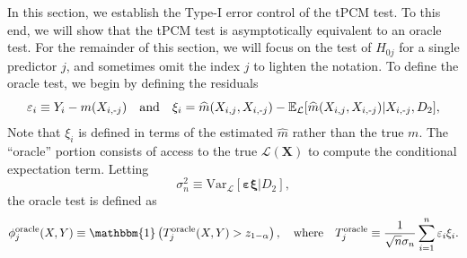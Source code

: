 \documentclass[12pt]{article}
\theoremstyle{definition}
\theoremstyle{remark}
\newcommand{\E}{\mathbb E}								%
\newcommand{\prx}{\bm X}								%
\newcommand{\srx}{X}									%
\newcommand{\sry}{Y}									%
\newcommand{\law}{\mathcal L}							%
\newcommand{\minus}{\textnormal{-}} 						    %
\begin{document}
In this section, we establish the Type-I error control of the tPCM test. To this end, we will show that the tPCM test is asymptotically equivalent to an oracle test. For the remainder of this section, we will focus on the test of $H_{0j}$ for a single predictor $j$, and sometimes omit the index $j$ to lighten the notation. To define the oracle test, we begin by defining the residuals 
\begin{equation}
\varepsilon_i \equiv \sry_i - m(\srx_{i,\minus j}) \quad \text{and} \quad \xi_i = \widehat{m}(\srx_{i,j},\srx_{i,\minus j}) - \E_{\law} [\widehat{m}(\srx_{i,j},\srx_{i,\minus j}) |\srx_{i,\minus j},D_2],
\end{equation}
Note that $\xi_i$ is defined in terms of the estimated $\widehat m$ rather than the true $m$. The ``oracle'' portion consists of access to the true $\law(\prx)$ to compute the conditional expectation term. Letting 
\begin{equation}
\sigma_n^2 \equiv \mathrm{Var}_\law[\bm{\varepsilon}\bm{\xi} | D_2], 
\end{equation}
the oracle test is defined as
\begin{equation}
\phi_j^{\textnormal{oracle}}(\srx,\sry) \equiv \mathbbm{1}\left(T^{\textnormal{oracle}}_j(\srx,\sry) > z_{1-\alpha}\right), \quad \text{where} \quad T_j^{\textnormal{oracle}} \equiv \frac{1}{\sqrt n \sigma_n} \sum_{i=1}^n\varepsilon_i\xi_i.
\label{eq:oracle-test}
\end{equation}
\end{document}
